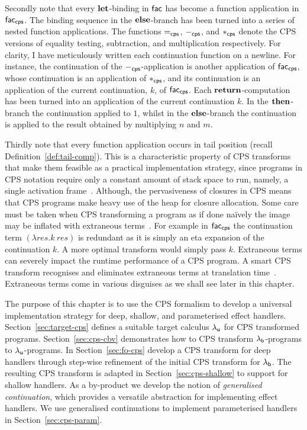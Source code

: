 \documentclass[12pt,phd,lfcs,twoside,openright,logo,leftchapter,normalheadings]{infthesis}
\theoremstyle{plain}
\theoremstyle{definition}
\begin{document}
Secondly note that every $\mathbf{let}$-binding in $\mathsf{fac}$ has become a
function application in $\mathsf{fac}_{\mathsf{cps}}$. The binding sequence
in the $\mathbf{else}$-branch has been turned into a series of nested function
applications. The functions $=_{\mathsf{cps}}$, $-_{\mathsf{cps}}$, and
$*_{\mathsf{cps}}$ denote the CPS versions of equality testing,
subtraction, and multiplication respectively.
%
For clarity, I have meticulously written each continuation function on
a newline. For instance, the continuation of the
$-_{\mathsf{cps}}$-application is another application of
$\mathsf{fac}_{\mathsf{cps}}$, whose continuation is an application of
$*_{\mathsf{cps}}$, and its continuation is an application of the current
continuation, $k$, of $\mathsf{fac}_{\mathsf{cps}}$.
%
Each $\mathbf{return}$-computation has been turned into an application of the
current continuation $k$. In the $\mathbf{then}$-branch the continuation
applied to $1$, whilst in the $\mathbf{else}$-branch the continuation is
applied to the result obtained by multiplying $n$ and $m$.

%
Thirdly note that every function application occurs in tail position
(recall Definition~\ref{def:tail-comp}). This is a characteristic
property of CPS transforms that make them feasible as a practical
implementation strategy, since programs in CPS notation require only a
constant amount of stack space to run, namely, a single activation
frame~\cite{Appel92}. Although, the pervasiveness of closures in CPS
means that CPS programs make heavy use of the heap for closure
allocation.
%
Some care must be taken when CPS transforming a program as if done
naïvely the image may be inflated with extraneous
terms~\cite{DanvyN05}. For example in $\mathsf{fac}_{\mathsf{cps}}$ the
continuation term $(\lambda res.k~res)$ is redundant as it is simply
an eta expansion of the continuation $k$. A more optimal transform
would simply pass $k$. Extraneous terms can severely impact the
runtime performance of a CPS program. A smart CPS transform recognises
and eliminates extraneous terms at translation
time~\cite{DanvyN03}. Extraneous terms come in various disguises as we
shall see later in this chapter.

The purpose of this chapter is to use the CPS formalism to develop a
universal implementation strategy for deep, shallow, and parameterised
effect handlers. Section~\ref{sec:target-cps} defines a suitable
target calculus $\lambda_{\mathsf{u}}$ for CPS transformed
programs. Section~\ref{sec:cps-cbv} demonstrates how to CPS transform
$\lambda_{\mathsf{b}}$-programs to $\lambda_{\mathsf{u}}$-programs. In Section~\ref{sec:fo-cps}
develop a CPS transform for deep handlers through step-wise refinement
of the initial CPS transform for $\lambda_{\mathsf{b}}$. The resulting CPS transform
is adapted in Section~\ref{sec:cps-shallow} to support for shallow
handlers. As a by-product we develop the notion of \emph{generalised
  continuation}, which provides a versatile abstraction for
implementing effect handlers. We use generalised continuations to
implement parameterised handlers in Section~\ref{sec:cps-param}.
%
\end{document}
